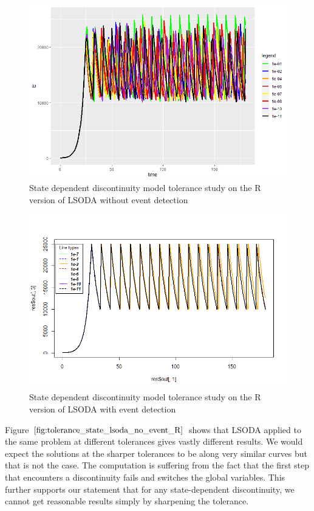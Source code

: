 \begin{figure}[h]
\centering
\includegraphics[width=0.7\linewidth]{./figures/tolerance_state_lsoda_no_event_R}
\caption{State dependent discontinuity model tolerance study on the R version of LSODA without event detection}
\label{fig:tolerance_state_lsoda_no_event_R}
\end{figure}

\begin{figure}[h]
\centering
\includegraphics[width=0.7\linewidth]{./figures/tolerance_state_lsoda_with_event_R}
\caption{State dependent discontinuity model tolerance study on the R version of LSODA with event detection}
\label{fig:tolerance_state_lsoda_with_event_R}
\end{figure}

Figure $\ref{fig:tolerance_state_lsoda_no_event_R}$ shows that LSODA applied to the same problem at different tolerances gives vastly different results. We would expect the solutions at the sharper tolerances to be along very similar curves but that is not the case. The computation is suffering from the fact that the first step that encounters a discontinuity fails and switches the global variables. This further supports our statement that for any state-dependent discontinuity, we cannot get reasonable results simply by sharpening the tolerance.

